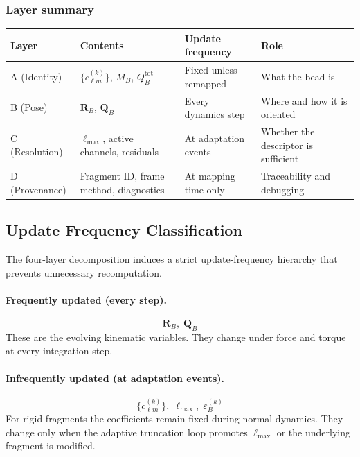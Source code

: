 \documentclass[11pt]{article}
\begin{document}
\subsubsection{Layer summary}

\begin{center}
\begin{tabular}{llll}
    \textbf{Layer} & \textbf{Contents} & \textbf{Update frequency} & \textbf{Role} \\
    \hline
    A (Identity)    & $\{c_{\ell m}^{(k)}\}$, $M_B$, $Q_B^{\mathrm{tot}}$
                    & Fixed unless remapped & What the bead is \\
    B (Pose)        & $\mathbf{R}_B$, $\mathbf{Q}_B$
                    & Every dynamics step & Where and how it is oriented \\
    C (Resolution)  & $\ell_{\max}$, active channels, residuals
                    & At adaptation events & Whether the descriptor is sufficient \\
    D (Provenance)  & Fragment ID, frame method, diagnostics
                    & At mapping time only & Traceability and debugging \\
\end{tabular}
\end{center}

\subsection{Update Frequency Classification}

The four-layer decomposition induces a strict update-frequency hierarchy
that prevents unnecessary recomputation.

\paragraph{Frequently updated (every step).}
\begin{equation}
    \mathbf{R}_B,\; \mathbf{Q}_B
\end{equation}
These are the evolving kinematic variables.  They change under force and
torque at every integration step.

\paragraph{Infrequently updated (at adaptation events).}
\begin{equation}
    \{c_{\ell m}^{(k)}\},\; \ell_{\max},\; \varepsilon_B^{(k)}
\end{equation}
For rigid fragments the coefficients remain fixed during normal dynamics.
They change only when the adaptive truncation loop promotes $\ell_{\max}$
or the underlying fragment is modified.
\end{document}
